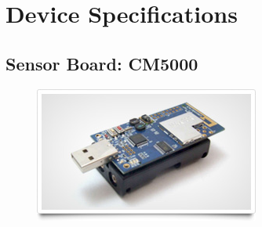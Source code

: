 \section{Device Specifications}

\subsection{Sensor Board: CM5000}

\begin{figure}[H]
\centering
\includegraphics[scale=0.5]{Images/CM5000}
\end{figure}

